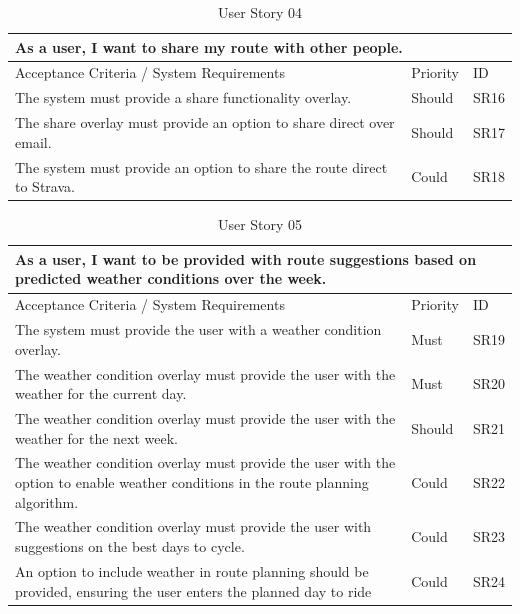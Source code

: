 \begin{table}[!htb]
\caption{User Story 04}
\label{tab:user-story-04}
\begin{tabular}{ p{11cm} p{1cm}  p{1cm} }
\hline
\multicolumn{3}{p{13cm}}{As a user, I want to share my route with other people.}\\ 
\hline
Acceptance Criteria / System Requirements & Priority & ID\\
\hline
The system must provide a share functionality overlay. & Should & SR16 \\
The share overlay must provide an option to share direct over email. & Should & SR17\\
The system must provide an option to share the route direct to Strava. & Could & SR18\\ 
\hline
\end{tabular}
\end{table}

\begin{table}[!htb]
\caption{User Story 05}
\label{tab:user-story-05}
\begin{tabular}{ p{11cm} p{1cm}  p{1cm} }
\hline
\multicolumn{3}{p{13cm}}{As a user, I want to be provided with route suggestions based on predicted weather conditions over the week.}\\ 
\hline
Acceptance Criteria / System Requirements & Priority & ID\\
\hline
The system must provide the user with a weather condition overlay. & Must & SR19 \\
The weather condition overlay must provide the user with the weather for the current day. & Must & SR20\\
The weather condition overlay must provide the user with the weather for the next week. & Should & SR21\\
The weather condition overlay must provide the user with the option to enable weather conditions in the route planning algorithm. & Could & SR22\\ 
The weather condition overlay must provide the user with suggestions on the best days to cycle. & Could & SR23\\
An option to include weather in route planning should be provided, ensuring the user enters the planned day to ride & Could & SR24\\ 
\hline
\end{tabular}
\end{table}

